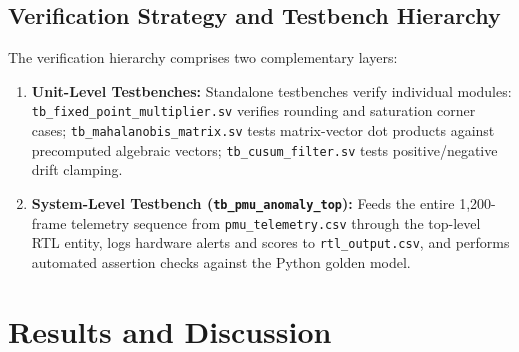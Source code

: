 \documentclass[11pt,a4paper]{report}
\begin{document}
\section{Verification Strategy and Testbench Hierarchy}
The verification hierarchy comprises two complementary layers:
\begin{enumerate}
    \item \textbf{Unit-Level Testbenches:} Standalone testbenches verify individual modules:
    \texttt{tb\_fixed\_point\_multiplier.sv} verifies rounding and saturation corner cases;
    \texttt{tb\_mahalanobis\_matrix.sv} tests matrix-vector dot products against precomputed
    algebraic vectors; \texttt{tb\_cusum\_filter.sv} tests positive/negative drift clamping.
    \item \textbf{System-Level Testbench (\texttt{tb\_pmu\_anomaly\_top}):} Feeds the entire 1,200-frame
    telemetry sequence from \texttt{pmu\_telemetry.csv} through the top-level RTL entity, logs hardware
    alerts and scores to \texttt{rtl\_output.csv}, and performs automated assertion checks against the
    Python golden model.
\end{enumerate}


\chapter{Results and Discussion}
\end{document}
